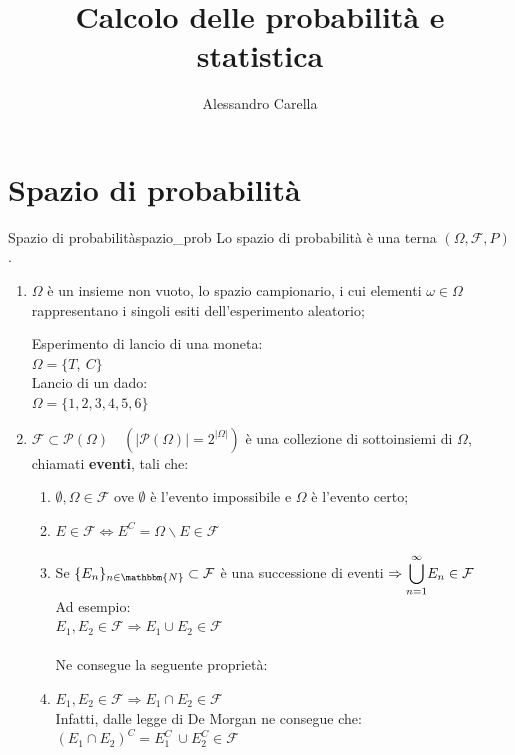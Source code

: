 \documentclass[12pt]{report}
\date{}
\author{Alessandro Carella}
\title{Calcolo delle probabilità e statistica}
\newcounter{definition}
\newcommand{\nmu}{}
\begin{document}
	{
		\let\cleardoublepage\clearpage
		\maketitle
		\tableofcontents
	}
	\chapter{Spazio di probabilità}
	\begin{definition}{\nmu Spazio di probabilità}{spazio_prob}
		Lo spazio di probabilità è una terna $(\Omega, \mathcal{F}, P)$.
		\begin{enumerate}
			\item $\Omega$ è un insieme non vuoto, lo spazio campionario, i cui elementi $\omega \in \Omega$ rappresentano i singoli esiti dell'esperimento aleatorio;
			\begin{example}{}{}
				Esperimento di lancio di una moneta: \\
				$\Omega = \{T,\ C\}$ \\
				Lancio di un dado: \\
				$\Omega = \{1, 2, 3, 4, 5, 6\}$
			\end{example}
			\item $\mathcal{F} \subset \mathcal{P}(\Omega) \quad (|\mathcal{P}(\Omega)| = 2^{|\Omega|})$ è una collezione di sottoinsiemi di $\Omega$, chiamati \textbf{eventi}, tali che:
			\begin{enumerate}
				\item $\emptyset, \Omega \in \mathcal{F}$ ove $\emptyset$ è l'evento impossibile e $\Omega$ è l'evento certo;
				\item $E \in \mathcal{F} \iff E^C = \Omega \backslash E \in \mathcal{F}$
				\item Se $\{E_n\}_{n \in \mathbbm{N}} \subset \mathcal{F}$ è una successione di eventi $\Rightarrow \mathlarger{\bigcup^{\infty}_{n=1}}E_n \in \mathcal{F}$ \\
				Ad esempio: \\
				$E_1, E_2 \in \mathcal{F} \Rightarrow E_1 \cup E_2 \in \mathcal{F}$ \\ \\
				Ne consegue la seguente proprietà:
				\item $E_1, E_2 \in \mathcal{F} \Rightarrow E_1 \cap E_2 \in \mathcal{F}$ \\
				Infatti, dalle legge di De Morgan ne consegue che: \\
				$(E_1 \cap E_2)^C = E_1^C\ \cup E_2^C \in \mathcal{F}$ \\

\end{enumerate}
\end{enumerate}
\end{definition}
\end{document}
